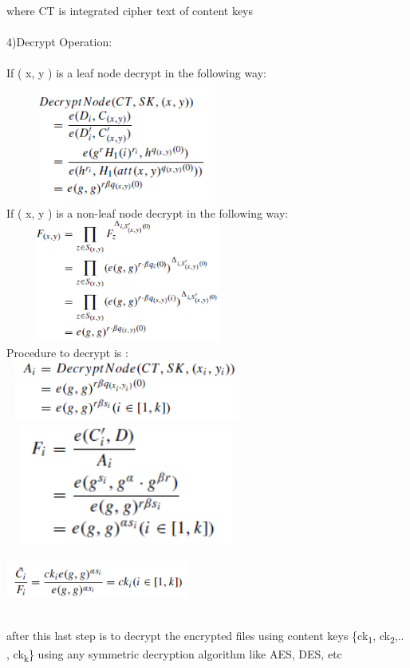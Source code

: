 \documentclass[a4paper,12pt]{article}
\begin{document}
where CT is integrated cipher text of content keys\\ \\
4)Decrypt Operation:\\ \\
If ( x, y ) is a leaf node decrypt in the following way:\\
\includegraphics[width=8cm,height=4cm]{fig9.PNG}\\
If ( x, y ) is a non-leaf node decrypt in the following way:\\
\includegraphics[width=8cm,height=4cm]{fig10.PNG}\\
Procedure to decrypt is :\\
\includegraphics[width=8cm,height=2cm]{fig11.PNG}\\
\includegraphics[width=8cm,height=4cm]{fig12.PNG}\\
\includegraphics[width=6cm,height=2cm]{fig13.PNG}\\ \\
after this last step is to decrypt the encrypted files using content keys \{ck\textsubscript{1}, ck\textsubscript{2},.. , ck\textsubscript{k}\} using any symmetric decryption algorithm like AES, DES, etc
\end{document}
